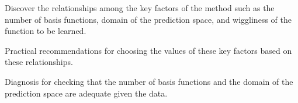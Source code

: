 \documentclass[landscape,a1,final]{a0poster} %
\let\tempone\itemize
\let\temptwo\enditemize
\renewenvironment{itemize}{\tempone\addtolength{\itemsep}{-0.3\baselineskip}}{\temptwo}
\begin{document}
\begin{minipage}{1\linewidth}
\begin{minipage}[t]{0.31\linewidth}
\begin{itemize}
\end{itemize}

\vspace{-5mm}
\hspace{1mm}
\centering  %
\begin{tcolorbox}[colframe=blue!20, colback=white, title={\scriptsize \color{black!80} Our contribution:}\; A performance analysis for the practical implementation of this reduce-rank GP (HSGP), colbacktitle=lightblue, coltitle=black, boxrule=0.5pt, width=0.98\textwidth]
	\begin{itemize}\setlength\itemsep{2mm}
	\item {\color{navyblue} Discover the relationships} among the key factors of the method such as the number of basis functions, domain of the prediction space, and wiggliness of the function to be learned.
	\item {\color{navyblue} Practical recommendations} for choosing the values of these key factors based on these relationships. %
	\item {\color{navyblue} Diagnosis} for checking that the number of basis functions and the domain of the prediction space are adequate given the data.
	\end{itemize}
\end{tcolorbox}




\end{minipage}
\end{minipage}
\end{document}
